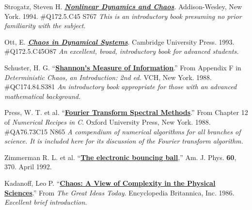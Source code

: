 \documentclass{../lab}
\begin{document}
\begingroup
\renewcommand{\addcontentsline}[3]{}%
\renewcommand{\section}[2]{}%
\begin{thebibliography}{}
     Strogatz, Steven H. \href{https://berkeley-physics111b.github.io/assets/pdf/oldwebsitestructure/Books/Strogatz_Nonlinear_dynamics_n_chaos.pdf}{\textbf{\emph{Nonlinear Dynamics and Chaos}}}. Addison-Wesley, New York. 1994. \#Q172.5.C45 S767
    \newline\emph{This is an introductory book presuming no prior familiarity with the subject.}

     Ott, E. \href{https://berkeley-physics111b.github.io/assets/pdf/oldwebsitestructure/Books/Ott_Chaos%20in%20Dynamical%20Systems.pdf}{\textbf{\emph{Chaos in Dynamical Systems}}}. Cambridge University Press. 1993. \#Q172.5.C45O87
    \newline\emph{An excellent, broad, introductory book for advanced students.}

     Schuster, H. G. ``\href{https://berkeley-physics111b.github.io/assets/pdf/oldwebsitestructure/NLD/References/13-Shannons_Measure_of_Information.pdf}{\textbf{Shannon's Measure of Information}}.'' From Appendix F in \emph{Deterministic Chaos, an Introduction: 2nd ed.} VCH, New York. 1988. \#QC174.84.S381
    \newline\emph{An introductory book appropriate for those with an advanced mathematical background.}

     Press, W. T. et al. ``\href{https://berkeley-physics111b.github.io/assets/pdf/oldwebsitestructure/NLD/References/11-Fourier_Transform_Spectral_Methods.pdf}{\textbf{Fourier Transform Spectral Methods}}.'' From Chapter 12 of \emph{Numerical Recipes in C}. Oxford University Press, New York. 1988. \#QA76.73C15 N865
    \newline\emph{A compendium of numerical algorithms for all branches of science. It is included here for its discussion of the Fourier transform algorithm.}

     Zimmerman R. L. et al. ``\href{https://berkeley-physics111b.github.io/assets/pdf/oldwebsitestructure/NLD/References/14-Electronic_Bouncing_Ball.pdf}{\textbf{The electronic bouncing ball}},'' Am. J. Phys. \textbf{60}, 370. April 1992.

     Kadanoff, Leo P. ``\href{https://berkeley-physics111b.github.io/assets/pdf/oldwebsitestructure/NLD/References/01-Chaos-A_View_of_Complexity.pdf}{\textbf{Chaos: A View of Complexity in the Physical Sciences}}.'' From \emph{The Great Ideas Today}. Encyclopedia Britannica, Inc. 1986. \newline\emph{Excellent brief introduction.}


\end{thebibliography}
\end{document}

